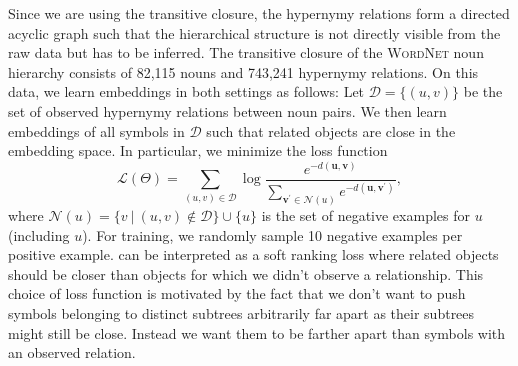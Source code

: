 \documentclass[11pt]{article}
\renewcommand{\vec}[1]{\bm{#1}}
\newcommand{\vu}{\vec{u}}
\newcommand{\vv}{\vec{v}}
\newcommand{\lossfn}{\mathcal{L}}
\newcommand{\Set}[1]{\mathcal{#1}}
\newcommand{\method}[1]{\textsc{#1}\xspace}
\begin{document}
Since we are using the transitive closure, the hypernymy relations form a directed acyclic graph 
such that the hierarchical structure is not directly visible from the raw data but has to be inferred. The
transitive closure of the \method{WordNet} noun hierarchy consists of 82,115
nouns and 743,241 hypernymy relations. On this data, we learn embeddings
in both settings as follows: Let \(\Set{D} = \{(u, v)\}\) be the set of observed
hypernymy relations between noun pairs. We then learn embeddings of all symbols
in \(\Set{D}\) such that related objects are close in the embedding space. In
particular, we minimize the loss function
\begin{equation}
  \lossfn(\Theta) = \sum_{(u,v) \in \Set{D}}\log \frac{e^{-d(\vu,\vv)}}{\sum_{\vv^\prime \in \Set{N}(u)} e^{-d(\vu,\vv^\prime)}} , \label{eq:soft-ranking}
\end{equation}
where \(\Set{N}(u) = \{v\ |\ (u, v) \not \in \Set{D}\} \cup \{u\}\) is the set of negative
examples for \(u\) (including \(u\)). For training, we randomly sample 10 negative
examples per positive example.  can be interpreted as a
soft ranking loss where related objects should be closer than objects for which
we didn't observe a relationship. This choice of loss function is motivated by
the fact that we don't want to push symbols belonging to distinct
subtrees arbitrarily far apart as their subtrees might still be close. Instead
we want them to be farther apart than symbols with an observed relation.
\end{document}
